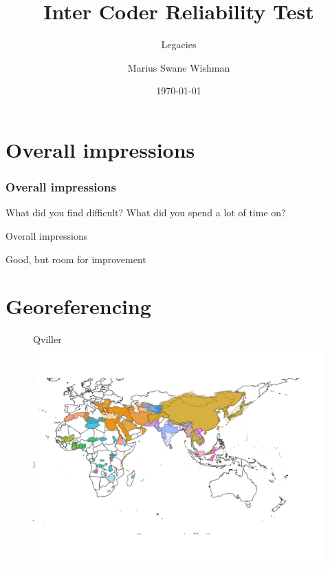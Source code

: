 \documentclass{beamer}
\title[ICR Test]{Inter Coder Reliability Test}
\subtitle{Legacies}
\author[Wishman]{Marius Swane Wishman}
\date{\today}
\institute{ISS}
\begin{document}
\begin{frame}[plain]
\titlepage 
\centering
\end{frame}

\section{Overall impressions} 

\begin{frame}
\frametitle{Overall impressions}
	
What did you find difficult? What did you spend a lot of time on?

\end{frame}

\begin{frame}{Overall impressions}

Good, but room for improvement

\end{frame}

\section{Georeferencing} \label{Georeferencing}

\begin{frame}{}

\begin{figure}[htpb]{Qviller}
	\centering
	\includegraphics[width=\linewidth]{img/MicrosoftTeams-image (1).png}
	\label{Qviller}
\end{figure}		

\end{frame}
\end{document}
